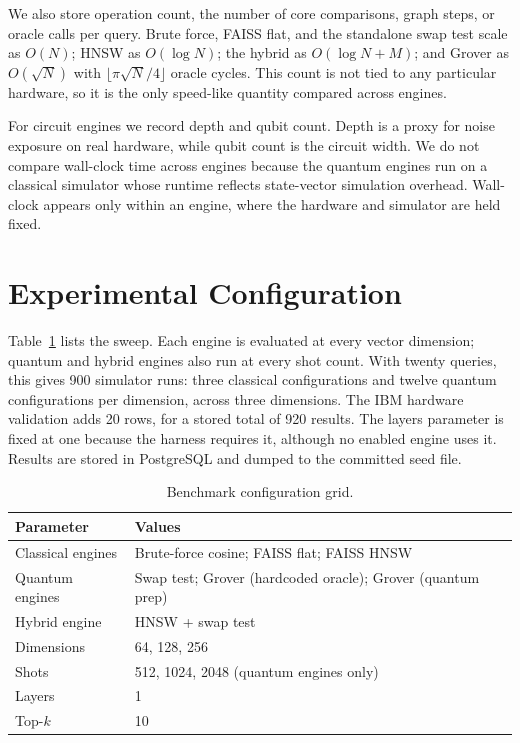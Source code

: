 We also store operation count, the number of core comparisons, graph steps, or
oracle calls per query. Brute force, FAISS flat, and the standalone swap test
scale as $O(N)$; HNSW as $O(\log N)$; the hybrid as $O(\log N + M)$; and Grover
as $O(\sqrt{N})$ with $\lfloor\pi\sqrt{N}/4\rfloor$ oracle cycles. This count is
not tied to any particular hardware, so it is the only speed-like quantity
compared across engines.

For circuit engines we record depth and qubit count. Depth is a proxy for noise
exposure on real hardware, while qubit count is the circuit width. We do not
compare wall-clock time across engines because the quantum engines run on a
classical simulator whose runtime reflects state-vector simulation overhead.
Wall-clock appears only within an engine, where the hardware and simulator are
held fixed.

\section{Experimental Configuration}
\label{sec:method:config}

Table~\ref{tab:config} lists the sweep. Each engine is evaluated at every vector
dimension; quantum and hybrid engines also run at every shot count. With twenty
queries, this gives 900 simulator runs: three classical configurations and
twelve quantum configurations per dimension, across three dimensions. The IBM
hardware validation adds 20 rows, for a stored total of 920 results. The layers
parameter is fixed at one because the harness requires it, although no enabled
engine uses it. Results are stored in PostgreSQL and dumped to the committed seed
file.

\begin{table}[htbp]
  \centering
  \caption{Benchmark configuration grid.}
  \label{tab:config}
  \renewcommand{\arraystretch}{1.3}
  \begin{tabularx}{\linewidth}{l X}
    \toprule
    \textbf{Parameter} & \textbf{Values} \\
    \midrule
    Classical engines   & Brute-force cosine; FAISS flat; FAISS HNSW \\
    \addlinespace
    Quantum engines     & Swap test; Grover (hardcoded oracle);
                          Grover (quantum prep) \\
    \addlinespace
    Hybrid engine       & HNSW + swap test \\
    \addlinespace
    Dimensions          & 64, 128, 256 \\
    \addlinespace
    Shots               & 512, 1024, 2048 (quantum engines only) \\
    \addlinespace
    Layers              & 1 \\
    \addlinespace
    Top-$k$             & 10 \\
    \bottomrule
  \end{tabularx}
\end{table}

